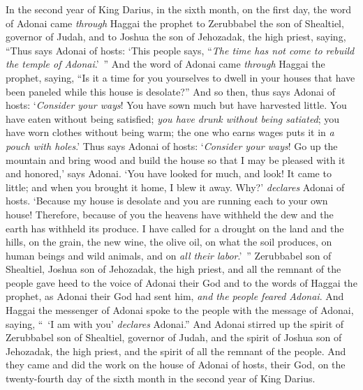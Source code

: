 
\begin{biblechapter} %
 In the second year of King Darius, in the sixth month, on the first day, the word of Adonai came \textit{through} Haggai the prophet to Zerubbabel the son of Shealtiel, governor of Judah, and to Joshua the son of Jehozadak, the high priest, saying,
\verse “Thus says Adonai of hosts: ‘This people says, “\textit{The time has not come to rebuild the temple of Adonai}.’ ” 
\verse And the word of Adonai came \textit{through} Haggai the prophet, saying,
\verse “Is it a time for you yourselves to dwell in your houses that have been paneled while this house is desolate?”
\verse And so then, thus says Adonai of hosts: ‘\textit{Consider your ways}!
\verse You have sown much but have harvested little. You have eaten without being satisfied; \textit{you have drunk without being satiated}; you have worn clothes without being warm; the one who earns wages puts it in \textit{a pouch with holes}.’
\verse Thus says Adonai of hosts: ‘\textit{Consider your ways}!
\verse Go up the mountain and bring wood and build the house so that I may be pleased with it and honored,’ says Adonai.
\verse ‘You have looked for much, and look! It came to little; and when you brought it home, I blew it away. Why?’ \textit{declares} Adonai of hosts. ‘Because my house is desolate and you are running each to your own house!
\verse Therefore, because of you the heavens have withheld the dew and the earth has withheld its produce.
\verse I have called for a drought on the land and the hills, on the grain, the new wine, the olive oil, on what the soil produces, on human beings and wild animals, and on \textit{all their labor}.’ ”
\verse Zerubbabel son of Shealtiel, Joshua son of Jehozadak, the high priest, and all the remnant of the people gave heed to the voice of Adonai their God and to the words of Haggai the prophet, as Adonai their God had sent him, \textit{and the people feared Adonai}.
\verse And Haggai the messenger of Adonai spoke to the people with the message of Adonai, saying, “ ‘I am with you’ \textit{declares} Adonai.”
\verse And Adonai stirred up the spirit of Zerubbabel son of Shealtiel, governor of Judah, and the spirit of Joshua son of Jehozadak, the high priest, and the spirit of all the remnant of the people. And they came and did the work on the house of Adonai of hosts, their God,
\verse on the twenty-fourth day of the sixth month in the second year of King Darius.
\end{biblechapter}

